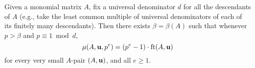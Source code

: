 \documentclass[11pt]{amsart}
\newcommand{\denom}{d}
\begin{document}
%
%
%
%
%
%

\newpage

\begin{corollary}
Given a monomial matrix $A$, fix a universal denominator $\denom$ for all the descendants of $A$ (e.g., take the least common multiple of universal denominators of each of its finitely many descendants).  Then there exists $\beta = \beta(A)$ such that whenever $p>\beta$ and $p \equiv 1 \bmod \denom$, 
\[
 \mu(A,\mathbf{u},p^e) = (p^e-1) \cdot \operatorname{ft}(A, \mathbf{u})
\]
for every very small $A$-pair $(A, \mathbf{u})$, and all $e \geq 1$. 
\end{corollary}
\end{document}

